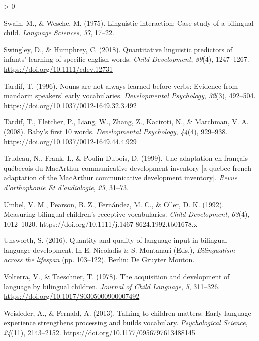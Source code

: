 \documentclass[
  english,
  ,man,floatsintext]{apa6}
\newlength{\cslhangindent}
\newenvironment{CSLReferences}[2] %
 {%
  \setlength{\parindent}{0pt}
  \ifodd #1 \everypar{\setlength{\hangindent}{\cslhangindent}}\ignorespaces\fi
  \ifnum #2 > 0
  \setlength{\parskip}{#2\baselineskip}
  \fi
 }%
 {}
\begin{document}
\begin{CSLReferences}{1}{0}
\leavevmode\hypertarget{ref-Swain_Wesche_1975}{}%
Swain, M., \& Wesche, M. (1975). Linguistic interaction: Case study of a bilingual child. \emph{Language Sciences}, \emph{37}, 17--22.

\leavevmode\hypertarget{ref-Swingley_Humphrey_2018}{}%
Swingley, D., \& Humphrey, C. (2018). Quantitative linguistic predictors of infants' learning of specific english words. \emph{Child Development}, \emph{89}(4), 1247--1267. \url{https://doi.org/10.1111/cdev.12731}

\leavevmode\hypertarget{ref-Tardif_1996}{}%
Tardif, T. (1996). Nouns are not always learned before verbs: Evidence from mandarin speakers' early vocabularies. \emph{Developmental Psychology}, \emph{32}(3), 492--504. \url{https://doi.org/10.1037/0012-1649.32.3.492}

\leavevmode\hypertarget{ref-Tardif_etal_2008}{}%
Tardif, T., Fletcher, P., Liang, W., Zhang, Z., Kaciroti, N., \& Marchman, V. A. (2008). Baby's first 10 words. \emph{Developmental Psychology}, \emph{44}(4), 929--938. \url{https://doi.org/10.1037/0012-1649.44.4.929}

\leavevmode\hypertarget{ref-Trudeau_etal_1999}{}%
Trudeau, N., Frank, I., \& Poulin-Dubois, D. (1999). Une adaptation en français québecois du MacArthur communicative development inventory {[}a quebec french adaptation of the MacArthur communicative development inventory{]}. \emph{Revue d'orthophonie Et d'audiologie}, \emph{23}, 31--73.

\leavevmode\hypertarget{ref-Umbel_etal_1992}{}%
Umbel, V. M., Pearson, B. Z., Fernández, M. C., \& Oller, D. K. (1992). Measuring bilingual children's receptive vocabularies. \emph{Child Development}, \emph{63}(4), 1012--1020. \url{https://doi.org/10.1111/j.1467-8624.1992.tb01678.x}

\leavevmode\hypertarget{ref-Unsworth_2016}{}%
Unsworth, S. (2016). Quantity and quality of language input in bilingual language development. In E. Nicoladis \& S. Montanari (Eds.), \emph{Bilingualism across the lifespan} (pp. 103--122). Berlin: De Gruyter Mouton.

\leavevmode\hypertarget{ref-Volterra_Taeschner_1978}{}%
Volterra, V., \& Taeschner, T. (1978). The acquisition and development of language by bilingual children. \emph{Journal of Child Language}, \emph{5}, 311--326. \url{https://doi.org/10.1017/S0305000900007492}

\leavevmode\hypertarget{ref-Weisleder_Fernald_2013}{}%
Weisleder, A., \& Fernald, A. (2013). Talking to children matters: Early language experience strengthens processing and builds vocabulary. \emph{Psychological Science}, \emph{24}(11), 2143--2152. \url{https://doi.org/10.1177/0956797613488145}


\end{CSLReferences}
\end{document}
